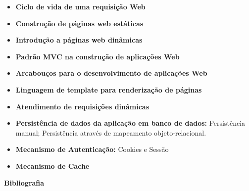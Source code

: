 \begin{itemize}

\item \textbf{Ciclo de vida de uma requisição Web}
\item \textbf{Construção de páginas web estáticas}
\item \textbf{Introdução a páginas web dinâmicas}
\item \textbf{Padrão MVC na construção de aplicações Web}
\item \textbf{Arcabouços para o desenvolvimento de aplicações Web}
\item \textbf{Linguagem de template para renderização de páginas}
\item \textbf{Atendimento de requisições dinâmicas}
\item \textbf{Persistência de dados da aplicação em banco de dados:}
    Persistência manual; Persistência através de mapeamento objeto-relacional.
\item \textbf{Mecanismo de Autenticação:}
    Cookies e Sessão
\item \textbf{Mecanismo de Cache}
  

\end{itemize}







\begin{snugshade}\begin{center}\textbf{
    Bibliografia
}\end{center}\end{snugshade}

